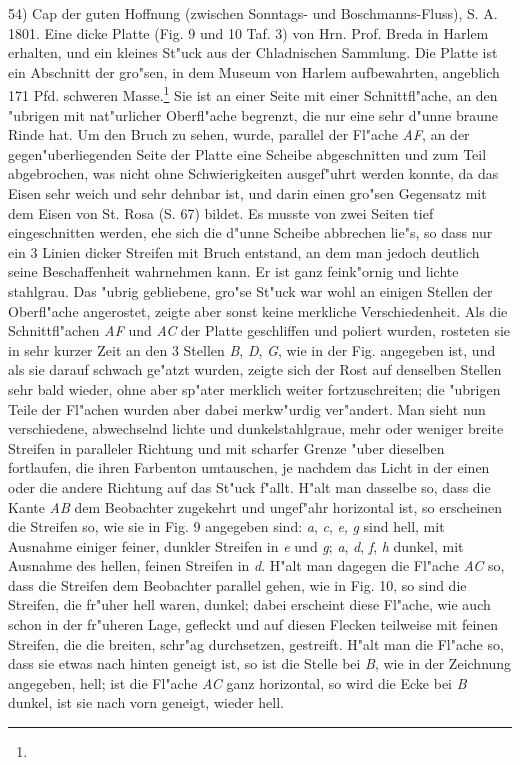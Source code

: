 \documentclass[a4paper, 11pt, oneside]{article}
\begin{document}
54) Cap der guten Hoffnung (zwischen Sonntags- und Boschmanns-Fluss), S. A. 1801. Eine dicke Platte (Fig. 9 und 10 Taf. 3) von Hrn. Prof. Breda in Harlem erhalten, und ein kleines St"uck aus der Chladnischen Sammlung. Die Platte ist ein Abschnitt der gro"sen, in dem Museum von Harlem aufbewahrten, angeblich 171 Pfd. schweren Masse.\footnote{} Sie ist an einer Seite mit einer Schnittfl"ache, an den "ubrigen mit nat"urlicher Oberfl"ache begrenzt, die nur eine sehr d"unne braune Rinde hat. Um den Bruch zu sehen, wurde, parallel der Fl"ache \emph{AF}, an der gegen"uberliegenden Seite der Platte eine Scheibe abgeschnitten und zum Teil abgebrochen, was nicht ohne Schwierigkeiten ausgef"uhrt werden konnte, da das Eisen sehr weich und sehr dehnbar ist, und darin einen gro"sen Gegensatz mit dem Eisen von St. Rosa (S. 67) bildet. Es musste von zwei Seiten tief eingeschnitten werden, ehe sich die d"unne Scheibe abbrechen lie"s, so dass nur ein 3 Linien dicker Streifen mit Bruch entstand, an dem man jedoch deutlich seine Beschaffenheit wahrnehmen kann. Er ist ganz feink"ornig und lichte stahlgrau. Das "ubrig gebliebene, gro"se St"uck war wohl an einigen Stellen der Oberfl"ache angerostet, zeigte aber sonst keine merkliche Verschiedenheit. Als die Schnittfl"achen \emph{AF} und \emph{AC} der Platte geschliffen und poliert wurden, rosteten sie in sehr kurzer Zeit an den 3 Stellen \emph{B}, \emph{D}, \emph{G}, wie in der Fig. angegeben ist, und als sie darauf schwach ge"atzt wurden, zeigte sich der Rost auf denselben Stellen sehr bald wieder, ohne aber sp"ater merklich weiter fortzuschreiten; die "ubrigen Teile der Fl"achen wurden aber dabei merkw"urdig ver"andert. Man sieht nun verschiedene, abwechselnd lichte und dunkelstahlgraue, mehr oder weniger breite Streifen in paralleler Richtung und mit scharfer Grenze "uber dieselben fortlaufen, die ihren Farbenton umtauschen, je nachdem das Licht in der einen oder die andere Richtung auf das St"uck f"allt. H"alt man dasselbe so, dass die Kante \emph{AB} dem Beobachter zugekehrt und ungef"ahr horizontal ist, so erscheinen die Streifen so, wie sie in Fig. 9 angegeben sind: \emph{a}, \emph{c}, \emph{e}, \emph{g} sind hell, mit Ausnahme einiger feiner, dunkler Streifen in \emph{e} und \emph{g}; \emph{a}, \emph{d}, \emph{f}, \emph{h} dunkel, mit Ausnahme des hellen, feinen Streifen in \emph{d}. H"alt man dagegen die Fl"ache \emph{AC} so, dass die Streifen dem Beobachter parallel gehen, wie in Fig. 10, so sind die Streifen, die fr"uher hell waren, dunkel; dabei erscheint diese Fl"ache, wie auch schon in der fr"uheren Lage, gefleckt und auf diesen Flecken teilweise mit feinen Streifen, die die breiten, schr"ag durchsetzen, gestreift. H"alt man die Fl"ache so, dass sie etwas nach hinten geneigt ist, so ist die Stelle bei \emph{B}, wie in der Zeichnung angegeben, hell; ist die Fl"ache \emph{AC} ganz horizontal, so wird die Ecke bei \emph{B} dunkel, ist sie nach vorn geneigt, wieder hell.
\end{document}
